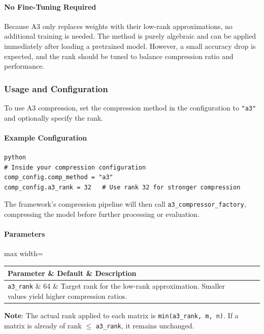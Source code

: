 \paragraph{No Fine-Tuning Required}

Because A3 only replaces weights with their low-rank approximations, no additional training is needed. The method is purely algebraic and can be applied immediately after loading a pretrained model. However, a small accuracy drop is expected, and the rank should be tuned to balance compression ratio and performance.


\subsubsection*{Usage and Configuration}

To use A3 compression, set the compression method in the configuration to \texttt{"a3"} and optionally specify the rank.

\paragraph{Example Configuration}

\vspace{0.5em}
\begin{mdframed}[backgroundcolor=codebg, linecolor=codeframe, linewidth=1pt, roundcorner=4pt, innerleftmargin=2pt, innerrightmargin=5pt, innertopmargin=5pt, innerbottommargin=5pt]
\begin{lstlisting}
python
# Inside your compression configuration
comp_config.comp_method = "a3"
comp_config.a3_rank = 32   # Use rank 32 for stronger compression
\end{lstlisting}
\end{mdframed}
\vspace{0.5em}

The framework's compression pipeline will then call \texttt{a3\_compressor\_factory}, compressing the model before further processing or evaluation.

\paragraph{Parameters}

\begin{center}
\begin{adjustbox}{max width=\columnwidth}
\renewcommand{\arraystretch}{1.2}
\begin{tabular}{lll}
\toprule
Parameter \& Default \& Description \\
\midrule
\texttt{a3\_rank} \& 64 \& Target rank for the low-rank approximation. Smaller values yield higher compression ratios. \\

\bottomrule
\end{tabular}
\end{adjustbox}
\end{center}
\textbf{Note}: The actual rank applied to each matrix is \texttt{min(a3\_rank, m, n)}. If a matrix is already of rank $\le$ \texttt{a3\_rank}, it remains unchanged.


